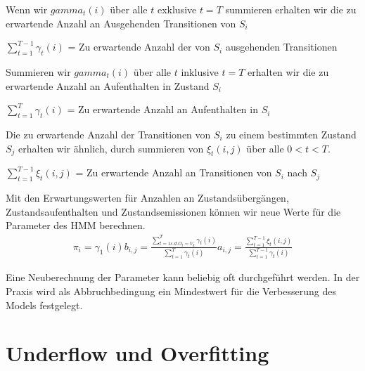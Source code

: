 Wenn wir $gamma_t(i)$ über alle $t$ exklusive $t=T$ summieren erhalten wir die 
zu erwartende Anzahl an Ausgehenden Transitionen von $S_i$

$\sum_{t=1}^{T-1} \gamma_t(i)$ = Zu erwartende Anzahl der von $S_i$ ausgehenden Transitionen

Summieren wir $gamma_t(i)$ über alle $t$ inklusive $t=T$ erhalten wir die zu erwartende Anzahl an Aufenthalten in
Zustand $S_i$

$\sum_{t=1}^{T} \gamma_t(i)$ = Zu erwartende Anzahl an Aufenthalten in $S_i$

Die zu erwartende Anzahl der Transitionen von $S_i$ zu einem bestimmten Zustand $S_j$ erhalten 
wir ähnlich, durch summieren von $\xi_t(i, j)$ über alle $0 < t < T$.

$\sum_{t=1}^{T-1} \xi_t(i, j)$ = Zu erwartende Anzahl an Transitionen von $S_i$ nach $S_j$

Mit den Erwartungswerten für Anzahlen an Zustandsübergängen, Zustandsaufenthalten und Zustandsemissionen
können wir neue Werte für die Parameter des HMM berechnen.
\begin{align*}
\pi_i = \gamma_1(i)
b_{i,j} = \frac{\sum_{t=1 s.d. O_t= V_k}^{T} \gamma_t(i)}{\sum_{t=1}^{T} \gamma_t(i)}
a_{i,j} = \frac{\sum_{t=1}^{T-1} \xi_t(i, j)}{\sum_{t=1}^{T-1} \gamma_t(i)}
\end{align*}

Eine Neuberechnung der Parameter kann beliebig oft durchgeführt werden.
In der Praxis wird als Abbruchbedingung ein Mindestwert für die Verbesserung des Models festgelegt.

\section{Underflow und Overfitting}










